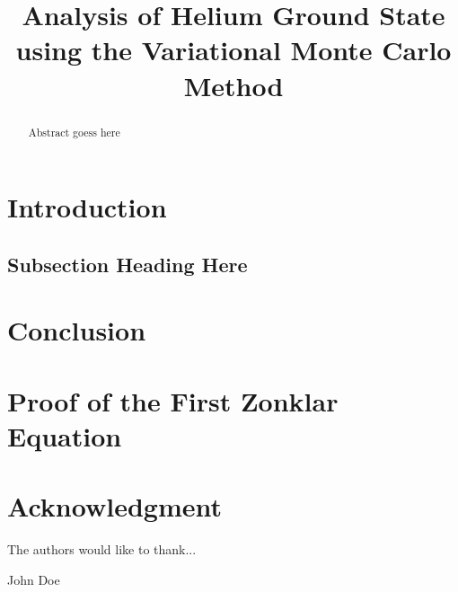 \documentclass[conference]{IEEEtran}
\begin{document}
\title{Analysis of Helium Ground State using the Variational Monte Carlo Method}


\author{
\and
{}
\and
{}
}


\maketitle


\begin{abstract}

Abstract goess here

\end{abstract}

\IEEEpeerreviewmaketitle



\section{Introduction}
\blindtext

\subsection{Subsection Heading Here}
\blindtext

\section{Conclusion}
\blindtext



\appendices
\section{Proof of the First Zonklar Equation}
\blindtext

\section*{Acknowledgment}


The authors would like to thank...

\ifCLASSOPTIONcaptionsoff
  \newpage
\fi




\begin{IEEEbiography}{John Doe}
\blindtext
\end{IEEEbiography}
\end{document}

